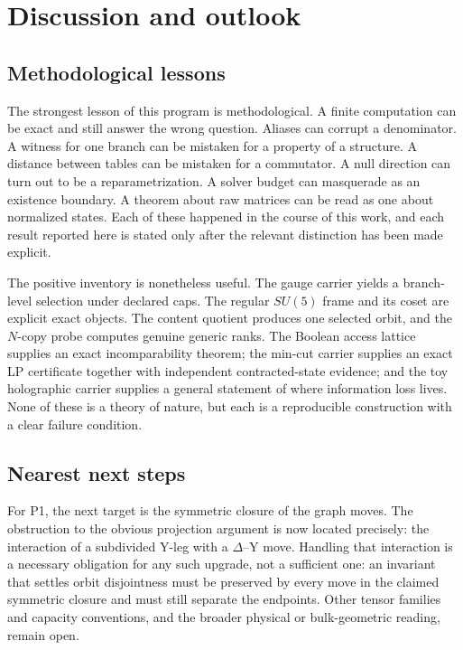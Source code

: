 \section{Discussion and outlook}\label{discussion-and-outlook}

\subsection{Methodological lessons}\label{what-the-corrections-change}

The strongest lesson of this program is methodological. A finite computation can be exact and still answer the wrong
question. Aliases can corrupt a denominator. A witness for one branch can be mistaken for a property of a structure. A
distance between tables can be mistaken for a commutator. A null direction can turn out to be a reparametrization. A
solver budget can masquerade as an existence boundary. A theorem about raw matrices can be read as one about normalized
states. Each of these happened in the course of this work, and each result reported here is stated only after the
relevant distinction has been made explicit.

The positive inventory is nonetheless useful. The gauge carrier yields a branch-level selection under declared caps.
The regular \(SU(5)\) frame and its coset are explicit exact objects. The content quotient produces one selected orbit,
and the \(N\)-copy probe computes genuine generic ranks. The Boolean access lattice supplies an exact incomparability
theorem; the min-cut carrier supplies an exact LP certificate together with independent contracted-state evidence;
and the toy holographic carrier supplies a general statement of where information loss lives. None of these is a
theory of nature, but each is a reproducible construction with a clear failure condition.

\subsection{Nearest next steps}\label{nearest-upgrades-precisely-typed-open-problems}

For P1, the next target is the symmetric closure of the graph moves. The obstruction to the obvious projection
argument is now located precisely: the interaction of a subdivided Y-leg with a \(\Delta\)--Y move. Handling that
interaction is a necessary obligation for any such upgrade, not a sufficient one: an invariant that settles orbit
disjointness must be preserved by every move in the claimed symmetric closure and must still separate the endpoints. Other
tensor families and capacity conventions, and the broader physical or bulk-geometric reading, remain open.

